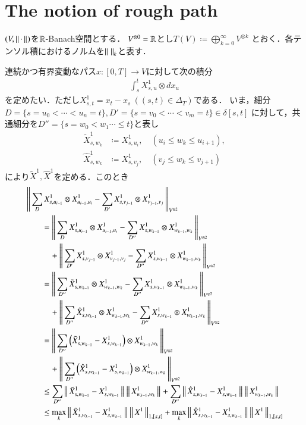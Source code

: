\section{The notion of rough path}
	$(V,\left\|\, \cdot\, \right\|_{})$を$\mathbb{R}$-Banach空間とする．
	$V^{\otimes 0} = \mathbb{R}$とし$T(V) \coloneqq \bigoplus_{k=0}^{\infty} V^{\otimes k}$
	とおく．各テンソル積におけるノルムを$\left\|\, \, \right\|_{k}$と表す．
	
	連続かつ有界変動なパス$x:[0,T] \longrightarrow V$に対して次の積分
	\begin{align}
		\int_s^t X^1_{s,u} \otimes d x_u
	\end{align}
	を定めたい．ただし$X^1_{s,t} = x_t - x_s\ ((s,t) \in \Delta_T)$である．
	いま，細分$D=\{s=u_0 < \cdots <u_n= t\},D'=\{s=v_0 < \cdots <v_m= t\} \in \delta[s,t]$
	に対して，共通細分を$D''=\{s=w_0 < w_1 \cdots \leq t\}$と表し
	\begin{align}
		\tilde{X}^1_{s,w_k} &\coloneqq X^1_{s,u_i},
		\quad (u_i \leq w_k \leq u_{i+1}), \\
		\hat{X}^1_{s,w_k} &\coloneqq X^1_{s,v_j},
		\quad (v_j \leq w_k \leq v_{j+1})
	\end{align}
	により$\tilde{X}^1,\hat{X}^1$を定める．このとき
	\begin{align}
		&\left\|\,  \sum_D X^1_{s,u_{i-1}} \otimes X^1_{u_{i-1},u_i} - 
			\sum_{D'} X^1_{s,v_{j-1}} \otimes X^1_{v_{j-1},v_j}\, \right\|_{V^{\otimes 2}} \\
		&\qquad= \left\|\,  \sum_D X^1_{s,u_{i-1}} \otimes X^1_{u_{i-1},u_i} - 
			\sum_{D''} X^1_{s,w_{k-1}} \otimes X^1_{w_{k-1},w_k}\, \right\|_{V^{\otimes 2}} \\
			&\quad\qquad + \left\|\,  \sum_{D'} X^1_{s,v_{j-1}} \otimes X^1_{v_{j-1},v_j} - 
			\sum_{D''} X^1_{s,w_{k-1}} \otimes X^1_{w_{k-1},w_k}\, \right\|_{V^{\otimes 2}} \\
		&\qquad= \left\|\,  \sum_{D''} \tilde{X}^1_{s,w_{k-1}} \otimes X^1_{w_{k-1},w_k} - 
			\sum_{D''} X^1_{s,w_{k-1}} \otimes X^1_{w_{k-1},w_k}\, \right\|_{V^{\otimes 2}} \\
			&\quad\qquad + \left\|\,  \sum_{D''} \hat{X}^1_{s,w_{k-1}} \otimes X^1_{w_{k-1},w_k} - 
			\sum_{D''} X^1_{s,w_{k-1}} \otimes X^1_{w_{k-1},w_k}\, \right\|_{V^{\otimes 2}} \\
		&\qquad= \left\|\,  \sum_{D''} \left(\tilde{X}^1_{s,w_{k-1}} -  X^1_{s,w_{k-1}} \right)
		 	\otimes X^1_{w_{k-1},w_k}\, \right\|_{V^{\otimes 2}} \\
			&\quad\qquad + \left\|\,  \sum_{D''} \left( \hat{X}^1_{s,w_{k-1}} - X^1_{s,w_{k-1}} \right)
			 \otimes X^1_{w_{k-1},w_k}\, \right\|_{V^{\otimes 2}} \\
		&\qquad \leq \sum_{D''} \left\|\, \tilde{X}^1_{s,w_{k-1}} -  X^1_{s,w_{k-1}}\, \right\|_{} \left\|\, X^1_{w_{k-1},w_k}\, \right\|_{}
			+ \sum_{D''} \left\|\, \hat{X}^1_{s,w_{k-1}} -  X^1_{s,w_{k-1}}\, \right\|_{} \left\|\, X^1_{w_{k-1},w_k}\, \right\|_{} \\
		&\qquad \leq \operatorname*{max}_{k} \left\|\, \tilde{X}^1_{s,w_{k-1}} -  X^1_{s,w_{k-1}}\, \right\|_{} 
			\left\|\, X^1\, \right\|_{1,[s,t]} + \operatorname*{max}_{k} \left\|\, \hat{X}^1_{s,w_{k-1}} -  X^1_{s,w_{k-1}}\, \right\|_{} 
			\left\|\, X^1\, \right\|_{1,[s,t]}
	\end{align}
